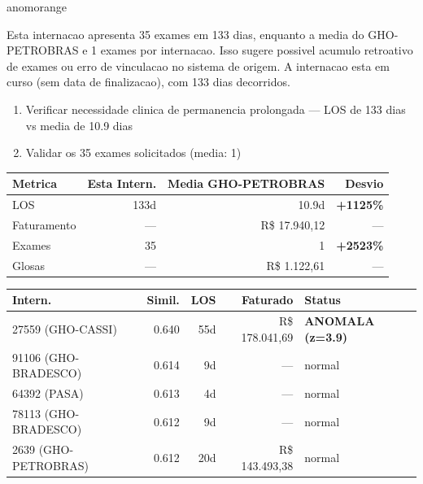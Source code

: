 \documentclass[a4paper,10pt]{article}
\begin{document}
\begin{anomalycard}[Internacao 154566 | GHO-PETROBRAS | ALTO (z=3.84)]{anomorange}
\vspace{2pt}\begin{tcolorbox}[colback=severityred!20,colframe=anomorange,title={\textbf{Interpretacao de Negocio}},fonttitle=\bfseries\small,left=4pt,right=4pt,top=3pt,bottom=3pt]
{\small Esta internacao apresenta 35 exames em 133 dias, enquanto a media do GHO-PETROBRAS e 1 exames por internacao. Isso sugere possivel acumulo retroativo de exames ou erro de vinculacao no sistema de origem. A internacao esta em curso (sem data de finalizacao), com 133 dias decorridos.}
\end{tcolorbox}
\begin{tcolorbox}[colback=severityyellow!30,colframe=anomorange,title={\textbf{Recomendacoes Especificas}},fonttitle=\bfseries\small,left=4pt,right=4pt,top=3pt,bottom=3pt]
\begin{enumerate}[nosep,leftmargin=16pt]
\item {\small Verificar necessidade clinica de permanencia prolongada --- LOS de 133 dias vs media de 10.9 dias}
\item {\small Validar os 35 exames solicitados (media: 1)}
\end{enumerate}
\end{tcolorbox}
\begin{center}\begin{tabular}{l r r r}\toprule\textbf{Metrica} & \textbf{Esta Intern.} & \textbf{Media GHO-PETROBRAS} & \textbf{Desvio} \\\midrule
LOS & 133d & 10.9d & \textcolor{anomred}{\textbf{+1125\%}} \\
Faturamento & --- & R\$ 17.940,12 & --- \\
Exames & 35 & 1 & \textcolor{anomred}{\textbf{+2523\%}} \\
Glosas & --- & R\$ 1.122,61 & --- \\
\bottomrule\end{tabular}\end{center}

\begin{tabular}{l r r r l}\toprule\textbf{Intern.} & \textbf{Simil.} & \textbf{LOS} & \textbf{Faturado} & \textbf{Status} \\\midrule
27559 (GHO-CASSI) & 0.640 & 55d & R\$ 178.041,69 & \textcolor{anomred}{\textbf{ANOMALA (z=3.9)}} \\
91106 (GHO-BRADESCO) & 0.614 & 9d & --- & \textcolor{jcubeblue}{normal} \\
64392 (PASA) & 0.613 & 4d & --- & \textcolor{jcubeblue}{normal} \\
78113 (GHO-BRADESCO) & 0.612 & 9d & --- & \textcolor{jcubeblue}{normal} \\
2639 (GHO-PETROBRAS) & 0.612 & 20d & R\$ 143.493,38 & \textcolor{jcubeblue}{normal} \\
\bottomrule\end{tabular}


\end{anomalycard}
\end{document}
